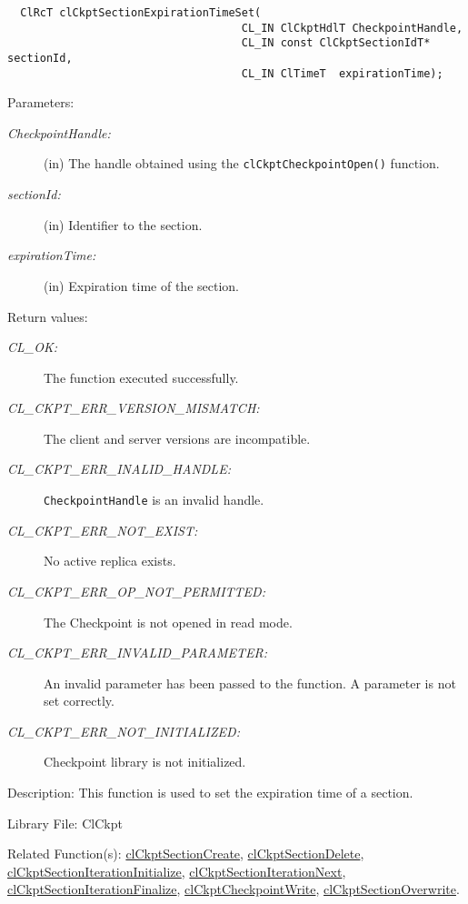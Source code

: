 \begin{flushleft}
\begin{Desc}
\footnotesize\begin{verbatim}  ClRcT clCkptSectionExpirationTimeSet(
                              		CL_IN ClCkptHdlT CheckpointHandle,
                              		CL_IN const ClCkptSectionIdT*   sectionId,
                              		CL_IN ClTimeT  expirationTime);
\end{verbatim}
\normalsize
\end{Desc}
\begin{Desc}
\item[Parameters:]
\begin{description}
\item[{\em Checkpoint\-Handle:}](in) The handle obtained using the {\tt{clCkptCheckpointOpen()}} function.
\item[{\em section\-Id:}](in) Identifier to the section. 
\item[{\em expiration\-Time:}](in) Expiration time of the section.\end{description}
\end{Desc}
\begin{Desc}
\item[Return values:]
\begin{description}
\item[{\em CL\_\-OK:}]The function executed successfully.
\item[{\em CL\_\-CKPT\_\-ERR\_\-VERSION\_\-MISMATCH:}]The client and server versions are incompatible.
\item[{\em CL\_\-CKPT\_\-ERR\_\-INALID\_\-HANDLE:}]{\tt{CheckpointHandle}} is an invalid handle.
\item[{\em CL\_\-CKPT\_\-ERR\_\-NOT\_\-EXIST:}] No active replica exists.
\item[{\em CL\_\-CKPT\_\-ERR\_\-OP\_\-NOT\_\-PERMITTED:}] The Checkpoint is not opened in read mode.
\item[{\em CL\_\-CKPT\_\-ERR\_\-INVALID\_\-PARAMETER:}]An invalid parameter has been passed to the function. A parameter is not set correctly.
\item[{\em CL\_\-CKPT\_\-ERR\_\-NOT\_\-INITIALIZED:}]Checkpoint library is not initialized. 
\end{description}
\end{Desc}
\begin{Desc}
\item[Description:]This function is used to set the expiration time of a section.\end{Desc}
\begin{Desc}
\item[Library File:]Cl\-Ckpt\end{Desc}
\begin{Desc}
\item[Related Function(s):]\hyperlink{pageckpt110}{cl\-Ckpt\-Section\-Create}, \hyperlink{pageckpt111}{cl\-Ckpt\-Section\-Delete}, 
\hyperlink{pageckpt113}{cl\-Ckpt\-Section\-Iteration\-Initialize}, \hyperlink{pageckpt114}{cl\-Ckpt\-Section\-Iteration\-Next}, 
\hyperlink{pageckpt115}{cl\-Ckpt\-Section\-Iteration\-Finalize}, \hyperlink{pageckpt116}{cl\-Ckpt\-Checkpoint\-Write},
\hyperlink{pageckpt117}{cl\-Ckpt\-Section\-Overwrite}. \end{Desc}
\newpage



\end{flushleft}
